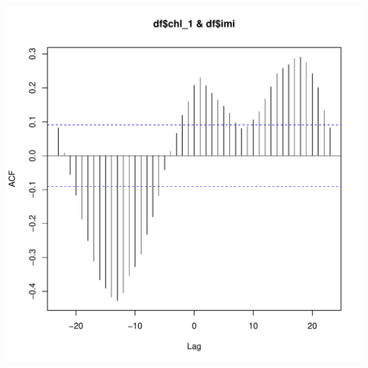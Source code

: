 \documentclass{article}\usepackage[]{graphicx}\usepackage[]{color}
\makeatletter
\def\maxwidth{ %
  \ifdim\Gin@nat@width>\linewidth
    \linewidth
  \else
    \Gin@nat@width
  \fi
}
\newenvironment{kframe}{%
 \def\at@end@of@kframe{}%
 \ifinner\ifhmode%
  \def\at@end@of@kframe{\end{minipage}}%
  \begin{minipage}{\columnwidth}%
 \fi\fi%
 \def\FrameCommand##1{\hskip\@totalleftmargin \hskip-\fboxsep
 \colorbox{shadecolor}{##1}\hskip-\fboxsep
     \hskip-\linewidth \hskip-\@totalleftmargin \hskip\columnwidth}%
 \MakeFramed {\advance\hsize-\width
   \@totalleftmargin\z@ \linewidth\hsize
   \@setminipage}}%
 {\par\unskip\endMakeFramed%
 \at@end@of@kframe}
\newenvironment{knitrout}{}{} %
\makeatother
\begin{document}
\begin{knitrout}
\begin{kframe}
\begin{alltt}
\end{alltt}
\end{kframe}
\includegraphics[width=\maxwidth]{figure/unnamed-chunk-31-2} 

\end{knitrout}
\end{document}
